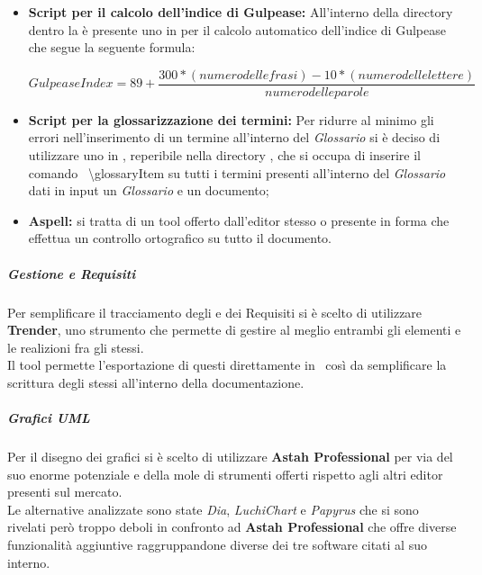         \begin{itemize}
          \item \textbf{Script  per il calcolo dell'indice di Gulpease: }All'interno della directory  dentro la  è presente
          uno  in  per il calcolo automatico dell'indice di Gulpease che segue la seguente formula:
          \begin{center}
            \begin{equation}
              Gulpease Index = 89+\frac{300*( numero delle frasi ) - 10*( numero delle lettere )}{numero delle parole}
            \end{equation}
          \end{center}
          \item \textbf{Script  per la glossarizzazione dei termini: }Per ridurre al minimo gli errori nell'inserimento di un termine all'interno
          del \emph{Glossario} si è deciso di utilizzare uno  in , reperibile nella directory , che si occupa di inserire
          il comando \glossaryItem{\LaTeX}\ \textbackslash glossaryItem{} su tutti i termini presenti all'interno del \emph{Glossario} dati in input un \emph{Glossario}
          e un documento;
          \item \textbf{Aspell: }si tratta di un tool offerto dall'editor stesso o presente in forma  che effettua un controllo ortografico
          su tutto il documento.
        \end{itemize}
      \subparagraph{Gestione  e Requisiti}
        Per semplificare il tracciamento degli  e dei Requisiti si è scelto di utilizzare \textbf{Trender}, uno strumento  che permette
        di gestire al meglio entrambi gli elementi e le realizioni fra gli stessi.\\
        Il tool permette l'esportazione di questi direttamente in \glossaryItem{\LaTeX}\, così da semplificare la scrittura degli stessi all'interno della documentazione.
    \subparagraph{Grafici UML}
      Per il disegno dei grafici  si è scelto di utilizzare \textbf{Astah Professional} per via del suo enorme potenziale e della mole di strumenti offerti
      rispetto agli altri editor presenti sul mercato.\\
      Le alternative analizzate sono state \emph{Dia}, \emph{LuchiChart} e \emph{Papyrus} che si sono rivelati però troppo deboli in confronto ad \textbf{Astah Professional} che offre
      diverse funzionalità aggiuntive raggruppandone diverse dei tre software citati al suo interno.
